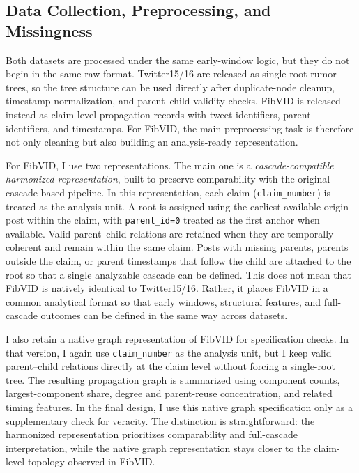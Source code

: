 \subsection{Data Collection, Preprocessing, and Missingness}
Both datasets are processed under the same early-window logic, but they do not begin in the same raw format. Twitter15/16 are released as single-root rumor trees, so the tree structure can be used directly after duplicate-node cleanup, timestamp normalization, and parent--child validity checks. FibVID is released instead as claim-level propagation records with tweet identifiers, parent identifiers, and timestamps. For FibVID, the main preprocessing task is therefore not only cleaning but also building an analysis-ready representation.

For FibVID, I use two representations. The main one is a \emph{cascade-compatible harmonized representation}, built to preserve comparability with the original cascade-based pipeline. In this representation, each claim (\texttt{claim\_number}) is treated as the analysis unit. A root is assigned using the earliest available origin post within the claim, with \texttt{parent\_id=0} treated as the first anchor when available. Valid parent--child relations are retained when they are temporally coherent and remain within the same claim. Posts with missing parents, parents outside the claim, or parent timestamps that follow the child are attached to the root so that a single analyzable cascade can be defined. This does not mean that FibVID is natively identical to Twitter15/16. Rather, it places FibVID in a common analytical format so that early windows, structural features, and full-cascade outcomes can be defined in the same way across datasets.

I also retain a native graph representation of FibVID for specification checks. In that version, I again use \texttt{claim\_number} as the analysis unit, but I keep valid parent--child relations directly at the claim level without forcing a single-root tree. The resulting propagation graph is summarized using component counts, largest-component share, degree and parent-reuse concentration, and related timing features. In the final design, I use this native graph specification only as a supplementary check for veracity. The distinction is straightforward: the harmonized representation prioritizes comparability and full-cascade interpretation, while the native graph representation stays closer to the claim-level topology observed in FibVID.

